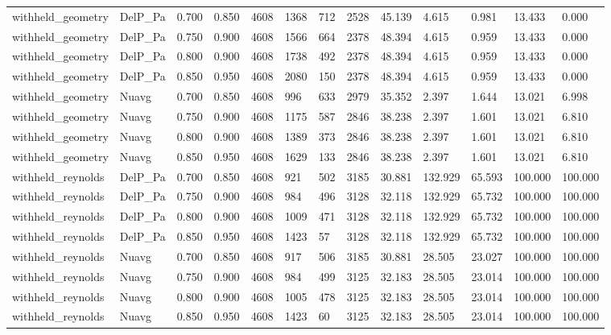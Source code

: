 \begin{tabular}{lllllllllllll}
withheld_geometry & DelP_Pa & 0.700 & 0.850 & 4608 & 1368 & 712 & 2528 & 45.139 & 4.615 & 0.981 & 13.433 & 0.000 \\
withheld_geometry & DelP_Pa & 0.750 & 0.900 & 4608 & 1566 & 664 & 2378 & 48.394 & 4.615 & 0.959 & 13.433 & 0.000 \\
withheld_geometry & DelP_Pa & 0.800 & 0.900 & 4608 & 1738 & 492 & 2378 & 48.394 & 4.615 & 0.959 & 13.433 & 0.000 \\
withheld_geometry & DelP_Pa & 0.850 & 0.950 & 4608 & 2080 & 150 & 2378 & 48.394 & 4.615 & 0.959 & 13.433 & 0.000 \\
withheld_geometry & Nuavg & 0.700 & 0.850 & 4608 & 996 & 633 & 2979 & 35.352 & 2.397 & 1.644 & 13.021 & 6.998 \\
withheld_geometry & Nuavg & 0.750 & 0.900 & 4608 & 1175 & 587 & 2846 & 38.238 & 2.397 & 1.601 & 13.021 & 6.810 \\
withheld_geometry & Nuavg & 0.800 & 0.900 & 4608 & 1389 & 373 & 2846 & 38.238 & 2.397 & 1.601 & 13.021 & 6.810 \\
withheld_geometry & Nuavg & 0.850 & 0.950 & 4608 & 1629 & 133 & 2846 & 38.238 & 2.397 & 1.601 & 13.021 & 6.810 \\
withheld_reynolds & DelP_Pa & 0.700 & 0.850 & 4608 & 921 & 502 & 3185 & 30.881 & 132.929 & 65.593 & 100.000 & 100.000 \\
withheld_reynolds & DelP_Pa & 0.750 & 0.900 & 4608 & 984 & 496 & 3128 & 32.118 & 132.929 & 65.732 & 100.000 & 100.000 \\
withheld_reynolds & DelP_Pa & 0.800 & 0.900 & 4608 & 1009 & 471 & 3128 & 32.118 & 132.929 & 65.732 & 100.000 & 100.000 \\
withheld_reynolds & DelP_Pa & 0.850 & 0.950 & 4608 & 1423 & 57 & 3128 & 32.118 & 132.929 & 65.732 & 100.000 & 100.000 \\
withheld_reynolds & Nuavg & 0.700 & 0.850 & 4608 & 917 & 506 & 3185 & 30.881 & 28.505 & 23.027 & 100.000 & 100.000 \\
withheld_reynolds & Nuavg & 0.750 & 0.900 & 4608 & 984 & 499 & 3125 & 32.183 & 28.505 & 23.014 & 100.000 & 100.000 \\
withheld_reynolds & Nuavg & 0.800 & 0.900 & 4608 & 1005 & 478 & 3125 & 32.183 & 28.505 & 23.014 & 100.000 & 100.000 \\
withheld_reynolds & Nuavg & 0.850 & 0.950 & 4608 & 1423 & 60 & 3125 & 32.183 & 28.505 & 23.014 & 100.000 & 100.000 \\
\hline
\end{tabular}

